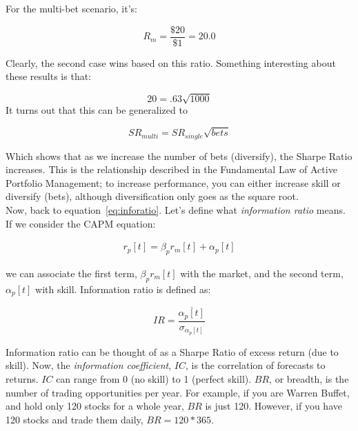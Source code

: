 \noindent For the multi-bet scenario, it's:

\begin{equation*}
	R_{m} = \frac{\$20}{\$1} = 20.0
\end{equation*}

\noindent Clearly, the second case wins based on this ratio. Something interesting about these results is that:

\begin{equation*}
	20 = .63\sqrt{1000}
\end{equation*}
\noindent It turns out that this can be generalized to 

\begin{equation*}
	{SR}_{multi} = {SR}_{single}\sqrt{bets}
\end{equation*}

\noindent Which shows that as we increase the number of bets (diversify), the Sharpe Ratio increases. This is the relationship described in the Fundamental Law of Active Portfolio Management; to increase performance, you can either increase skill or diversify (bets), although diversification only goes as the square root.\\

\noindent Now, back to equation~\ref{eq:inforatio}. Let's define what \textit{information ratio} means. If we consider the CAPM equation:

\begin{align*}
r_p[t]=\beta_p r_m[t]+\alpha_p[t]
\end{align*}

\noindent we can associate the first term, $\beta_p r_m[t]$ with the market, and the second term, $\alpha_p[t]$ with skill. Information ratio is defined as:

\begin{equation} \label{eq:inforatiodef}
IR = \frac{\overline{\alpha_p[t]}}{\sigma_{\alpha_p[t]}}
\end{equation}

\noindent Information ratio can be thought of as a Sharpe Ratio of excess return (due to skill). Now, the \textit{information coefficient}, $IC$, is the correlation of forecasts to returns. $IC$ can range from 0 (no skill) to 1 (perfect skill). $BR$, or breadth, is the number of trading opportunities per year. For example, if you are Warren Buffet, and hold only 120 stocks for a whole year, $BR$ is just 120. However, if you have 120 stocks and trade them daily, $BR = 120*365$.\\

